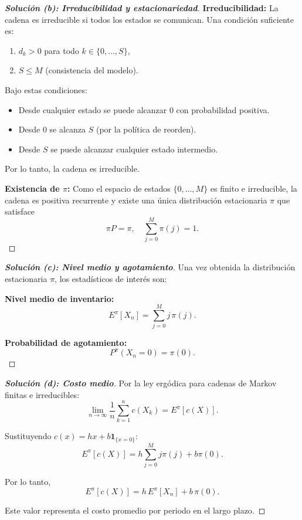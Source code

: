 \documentclass[10pt,a4paper]{article}
\begin{document}
\begin{proof}[\textbf{Solución (b): Irreducibilidad y estacionariedad}]
    \textbf{Irreducibilidad:} La cadena es irreducible si todos los estados se comunican. Una condición suficiente es:
    \begin{enumerate}
        \item $d_k > 0$ para todo $k \in \{0, \dots, S\}$,
        \item $S \le M$ (consistencia del modelo).
    \end{enumerate}
    
    Bajo estas condiciones:
    \begin{itemize}
        \item Desde cualquier estado se puede alcanzar $0$ con probabilidad positiva.
        \item Desde $0$ se alcanza $S$ (por la política de reorden).
        \item Desde $S$ se puede alcanzar cualquier estado intermedio.
    \end{itemize}
    Por lo tanto, la cadena es irreducible.

    \textbf{Existencia de $\pi$:} Como el espacio de estados $\{0,\dots,M\}$ es finito e irreducible, la cadena es positiva recurrente y existe una única distribución estacionaria $\pi$ que satisface
    \[
    \pi P = \pi, \quad \sum_{j=0}^M \pi(j) = 1.
    \]
\end{proof}

\vspace{5mm}

\begin{proof}[\textbf{Solución (c): Nivel medio y agotamiento}]
    Una vez obtenida la distribución estacionaria $\pi$, los estadísticos de interés son:

    \textbf{Nivel medio de inventario:}
    \[
    E^\pi[X_n] = \sum_{j=0}^M j \, \pi(j).
    \]

    \textbf{Probabilidad de agotamiento:}
    \[
    P^\pi(X_n = 0) = \pi(0).
    \]
\end{proof}

\vspace{5mm}

\begin{proof}[\textbf{Solución (d): Costo medio}]
    Por la ley ergódica para cadenas de Markov finitas e irreducibles:
    \[
    \lim_{n \to \infty} \frac{1}{n} \sum_{k=1}^n c(X_k)
    = E^\pi[c(X)].
    \]

    Sustituyendo $c(x) = hx + b \mathbf{1}_{\{x=0\}}$:
    \[
    E^\pi[c(X)] = h \sum_{j=0}^M j \pi(j) + b \pi(0).
    \]

    Por lo tanto,
    \[
    E^\pi[c(X)] = h\, E^\pi[X_n] + b\, \pi(0).
    \]

    Este valor representa el costo promedio por periodo en el largo plazo.
\end{proof}
\end{document}
